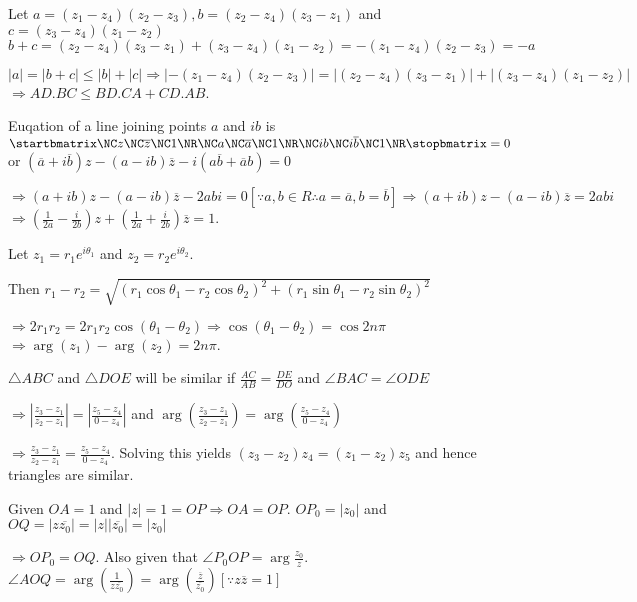   Let $a = (z_1 - z_4)(z_2 - z_3), b = (z_2 - z_4)(z_3 - z_1)$ and $c = (z_3 - z_4)(z_1 - z_2)$
  $b + c = (z_2 - z_4)(z_3 - z_1) + (z_3 - z_4)(z_1 - z_2) = -(z_1 - z_4)(z_2 - z_3) = -a$

  $|a| = |b + c| \leq |b| + |c| \Rightarrow |-(z_1 - z_4)(z_2 - z_3)| = |(z_2 - z_4)(z_3 - z_1)| + |(z_3 -
  z_4)(z_1 - z_2)|$
  $\Rightarrow AD.BC\leq BD.CA + CD.AB$.
\item Euqation of a line joining points $a$ and $ib$ is
  $\startbmatrix\NC z \NC \overline{z} \NC 1\NR\NC a \NC \overline{a} \NC 1 \NR\NC ib \NC i\overline{b} \NC
  1\NR\stopbmatrix = 0$ or $(\overline{a} +i\overline{b})z - (a - ib)\overline{z} - i(a\overline{b} +
  \overline{a}b) = 0$

  $\Rightarrow (a + ib)z - (a -ib)\overline{z} - 2abi = 0[\because a, b\in R \therefore a = \overline{a}, b
    = \overline{b}]\Rightarrow (a + ib)z - (a -ib)\overline{z} = 2abi$
  $\Rightarrow \left(\frac{1}{2a} - \frac{i}{2b}\right)z + \left(\frac{1}{2a} +
  \frac{i}{2b}\right)\overline{z} = 1$.
\item Let $z_1 = r_1e^{i\theta_1}$ and $z_2 = r_2e^{i\theta_2}$.

  Then $r_1 - r_2 = \sqrt{(r_1\cos\theta_1 - r_2\cos\theta_2)^2 + (r_1\sin\theta_1 - r_2\sin\theta_2)^2}$

  $\Rightarrow 2r_1r_2 = 2r_1r_2\cos(\theta_1 - \theta_2)\Rightarrow \cos(\theta_1- \theta_2) = \cos 2n\pi$
  $\Rightarrow \arg(z_1) - \arg(z_2) = 2n\pi$.
\item $\triangle ABC$ and $\triangle DOE$ will be similar if
  $\frac{AC}{AB} = \frac{DE}{DO}$ and $\angle BAC = \angle ODE$

  $\Rightarrow \left|\frac{z_3 - z_1}{z_2 - z_1}\right| = \left|\frac{z_5 - z_4}{0 - z_4}\right|$ and
  $\arg\left(\frac{z_3 - z_1}{z_2 - z_1}\right) = \arg\left(\frac{z_5 - z_4}{0 - z_4}\right)$

  $\Rightarrow \frac{z_3 - z_1}{z_2 - z_1} = \frac{z_5 - z_4}{0 - z_4}$.
  Solving this yields $(z_3 - z_2)z_4 = (z_1 - z_2)z_5$ and hence triangles are similar.
\item Given $OA = 1$ and $|z| = 1 = OP \Rightarrow OA = OP$. $OP_0 = |z_0|$ and $OQ = |z\overline{z_0}| =
  |z||\overline{z_0}| = |z_0|$

  $\Rightarrow OP_0 = OQ$. Also given that $\angle P_0OP = \arg\frac{z_0}{z}$.
  $\angle AOQ = \arg\left(\frac{1}{z\overline{z_0}}\right) =
  \arg\left(\frac{\overline{z}}{\overline{z_0}}\right)[\because z\overline{z} = 1]$

